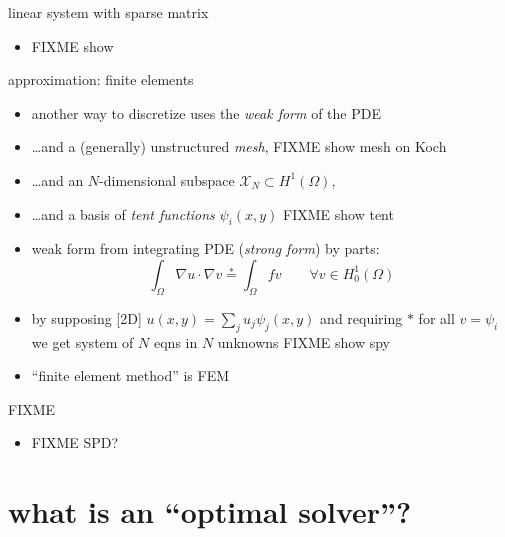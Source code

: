 \documentclass[hide notes,intlimits,usenames,dvipsnames]{beamer}
\newcommand{\grad}{\nabla}
\begin{document}
\begin{frame}{linear system with sparse matrix}
\begin{itemize}
\item FIXME show
\end{itemize}
\end{frame}


\begin{frame}{approximation: finite elements}
\begin{itemize}
\item another way to discretize uses the \emph{weak form} of the PDE
\item \dots and a (generally) unstructured \emph{mesh}, FIXME show mesh on Koch
\item \dots and an $N$-dimensional subspace $\mathcal{X}_N \subset H^1(\Omega)$,
\item \dots and a basis of \emph{tent functions} $\psi_i(x,y)$ FIXME show tent
\item weak form from integrating PDE (\emph{strong form}) by parts:
    $$\int_\Omega \grad u \cdot \grad v \stackrel{\ast}{=} \int_\Omega f v \qquad \forall v \in H_0^1(\Omega)$$
\item by supposing [2D] $u(x,y) = \sum_j u_{j} \psi_{j}(x,y)$ and requiring $\ast$ for all $v=\psi_i$ we get system of $N$ eqns in $N$ unknowns FIXME show spy
\item ``finite element method'' is FEM
\end{itemize}
\end{frame}


\begin{frame}{FIXME}
\begin{itemize}
\item FIXME  SPD?
\end{itemize}
\end{frame}


\section{what is an ``optimal solver''?}
\end{document}
